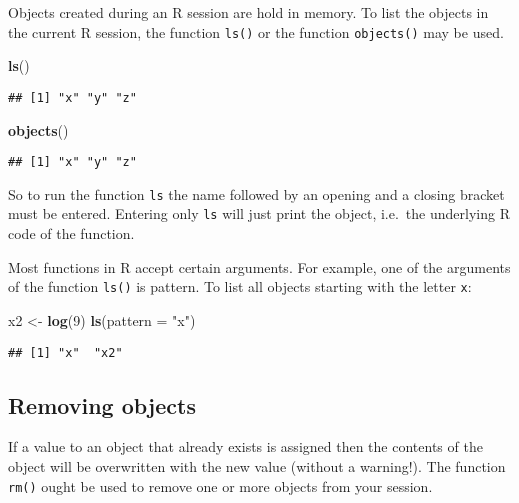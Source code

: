 \documentclass[]{book}
\newenvironment{Shaded}{\begin{snugshade}}{\end{snugshade}}
\newcommand{\KeywordTok}[1]{\textcolor[rgb]{0.13,0.29,0.53}{\textbf{{#1}}}}
\newcommand{\DataTypeTok}[1]{\textcolor[rgb]{0.13,0.29,0.53}{{#1}}}
\newcommand{\DecValTok}[1]{\textcolor[rgb]{0.00,0.00,0.81}{{#1}}}
\newcommand{\StringTok}[1]{\textcolor[rgb]{0.31,0.60,0.02}{{#1}}}
\newcommand{\NormalTok}[1]{{#1}}
\begin{document}
Objects created during an R session are hold in memory. To list the
objects in the current R session, the function \texttt{ls()} or the
function \texttt{objects()} may be used.

\begin{Shaded}
\begin{Highlighting}[]
\KeywordTok{ls}\NormalTok{()}
\end{Highlighting}
\end{Shaded}

\begin{verbatim}
## [1] "x" "y" "z"
\end{verbatim}

\begin{Shaded}
\begin{Highlighting}[]
\KeywordTok{objects}\NormalTok{()}
\end{Highlighting}
\end{Shaded}

\begin{verbatim}
## [1] "x" "y" "z"
\end{verbatim}

So to run the function \texttt{ls} the name followed by an opening and a
closing bracket must be entered. Entering only \texttt{ls} will just
print the object, i.e.~the underlying R code of the function.

Most functions in R accept certain arguments. For example, one of the
arguments of the function \texttt{ls()} is pattern. To list all objects
starting with the letter \texttt{x}:

\begin{Shaded}
\begin{Highlighting}[]
\NormalTok{x2 <-}\StringTok{ }\KeywordTok{log}\NormalTok{(}\DecValTok{9}\NormalTok{)}
\KeywordTok{ls}\NormalTok{(}\DataTypeTok{pattern =} \StringTok{"x"}\NormalTok{)}
\end{Highlighting}
\end{Shaded}

\begin{verbatim}
## [1] "x"  "x2"
\end{verbatim}

\subsection{Removing objects}\label{removing-objects}

If a value to an object that already exists is assigned then the
contents of the object will be overwritten with the new value (without a
warning!). The function \texttt{rm()} ought be used to remove one or
more objects from your session.
\end{document}
